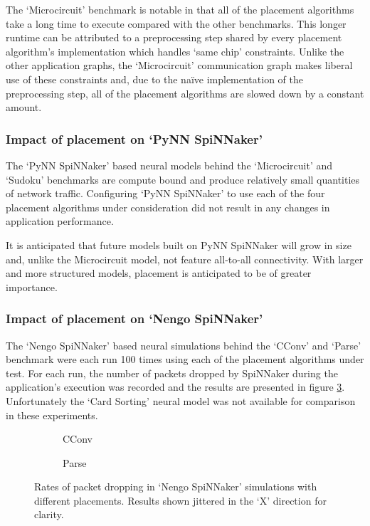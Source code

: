				The `Microcircuit' benchmark is notable in that all of the placement
				algorithms take a long time to execute compared with the other
				benchmarks. This longer runtime can be attributed to a preprocessing
				step shared by every placement algorithm's implementation which handles
				`same chip' constraints. Unlike the other application graphs, the
				`Microcircuit' communication graph makes liberal use of these
				constraints and, due to the na\"ive implementation of the preprocessing
				step, all of the placement algorithms are slowed down by a constant
				amount.
			
			\subsubsection{Impact of placement on `PyNN SpiNNaker'}
				
				The `PyNN SpiNNaker' based neural models behind the `Microcircuit' and
				`Sudoku' benchmarks are compute bound and produce relatively small
				quantities of network traffic. Configuring `PyNN SpiNNaker' to use each
				of the four placement algorithms under consideration did not result in
				any changes in application performance.
				
				It is anticipated that future models built on PyNN SpiNNaker will grow
				in size and, unlike the Microcircuit model, not feature all-to-all
				connectivity. With larger and more structured models, placement is
				anticipated to be of greater importance.
			
			\subsubsection{Impact of placement on `Nengo SpiNNaker'}
				
				The `Nengo SpiNNaker' based neural simulations behind the `CConv' and
				`Parse' benchmark were each run \num{100} times using each of the
				placement algorithms under test. For each run, the number of packets
				dropped by SpiNNaker during the application's execution was recorded
				and the results are presented in figure
				\ref{fig:nengo-dropped-packets}. Unfortunately the `Card Sorting'
				neural model was not available for comparison in these experiments.
				
				\begin{figure}
					\center
					\begin{subfigure}{0.45\linewidth}
						
						\caption{CConv}
						\label{fig:cconv-dropped-packets}
					\end{subfigure}
					\begin{subfigure}{0.45\linewidth}
						
						\caption{Parse}
						\label{fig:parse-dropped-packets}
					\end{subfigure}
					
					\caption{Rates of packet dropping in `Nengo SpiNNaker' simulations
					with different placements. Results shown jittered in the `X'
					direction for clarity.}
					\label{fig:nengo-dropped-packets}
				\end{figure}
				
